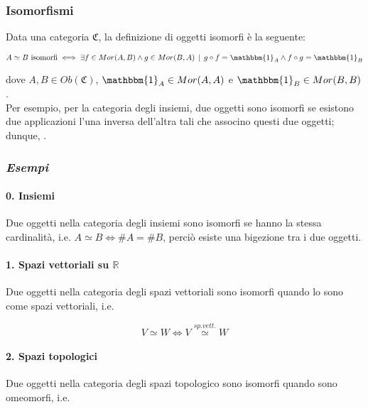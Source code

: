 \subsubsection{Isomorfismi}

Data una categoria $ \mathfrak{C} $, la definizione di oggetti isomorfi è la seguente:

\begin{equation}
	A \simeq B \text{ isomorfi} \iff \exists f \in Mor(A,B) \wedge g \in Mor(B,A) \, \mid \, g \circ f = \mathbbm{1}_{A} \wedge f \circ g = \mathbbm{1}_{B}
\end{equation}

dove $ A,B \in Ob(\mathfrak{C}) $, $ \mathbbm{1}_{A} \in Mor(A,A) $ e $ \mathbbm{1}_{B} \in Mor(B,B) $.\\
Per esempio, per la categoria degli insiemi, due oggetti sono isomorfi se esistono due applicazioni l'una inversa dell'altra tali che associno questi due oggetti; dunque, .

\subsubsection{\textit{Esempi}}

\paragraph{0. Insiemi}

Due oggetti nella categoria degli insiemi sono isomorfi se hanno la stessa cardinalità, i.e. $ A \simeq B \iff \# A = \# B $, perciò esiste una bigezione tra i due oggetti.

\paragraph{1. Spazi vettoriali su $ \mathbb{R} $}

Due oggetti nella categoria degli spazi vettoriali sono isomorfi quando lo sono come spazi vettoriali, i.e.

\begin{equation}
	V \simeq W \iff V \stackrel{sp.vett.}{\simeq} W
\end{equation}

\paragraph{2. Spazi topologici}

Due oggetti nella categoria degli spazi topologico sono isomorfi quando sono omeomorfi, i.e.

